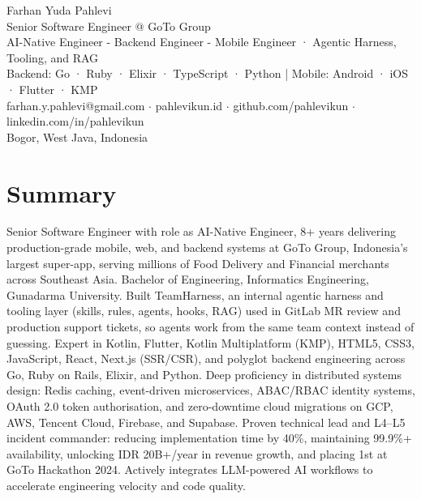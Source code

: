 \documentclass[11pt]{article}
\begin{document}
{\LARGE Farhan Yuda Pahlevi}\\
{\large Senior Software Engineer @ GoTo Group}\\
{\large AI-Native Engineer - Backend Engineer - Mobile Engineer · Agentic Harness, Tooling, and RAG}\\
Backend: Go · Ruby · Elixir · TypeScript · Python | Mobile: Android · iOS · Flutter · KMP\\
farhan.y.pahlevi@gmail.com $\cdot$ pahlevikun.id $\cdot$ github.com/pahlevikun $\cdot$ linkedin.com/in/pahlevikun\\
Bogor, West Java, Indonesia\\

\section*{Summary}
Senior Software Engineer with role as AI-Native Engineer, 8+ years delivering production-grade mobile, web, and backend systems at GoTo Group, Indonesia's largest super-app, serving millions of Food Delivery and Financial merchants across Southeast Asia. Bachelor of Engineering, Informatics Engineering, Gunadarma University. Built TeamHarness, an internal agentic harness and tooling layer (skills, rules, agents, hooks, RAG) used in GitLab MR review and production support tickets, so agents work from the same team context instead of guessing. Expert in Kotlin, Flutter, Kotlin Multiplatform (KMP), HTML5, CSS3, JavaScript, React, Next.js (SSR/CSR), and polyglot backend engineering across Go, Ruby on Rails, Elixir, and Python. Deep proficiency in distributed systems design: Redis caching, event-driven microservices, ABAC/RBAC identity systems, OAuth 2.0 token authorisation, and zero-downtime cloud migrations on GCP, AWS, Tencent Cloud, Firebase, and Supabase. Proven technical lead and L4–L5 incident commander: reducing implementation time by 40\%, maintaining 99.9\%+ availability, unlocking IDR 20B+/year in revenue growth, and placing 1st at GoTo Hackathon 2024. Actively integrates LLM-powered AI workflows to accelerate engineering velocity and code quality.
\end{document}
